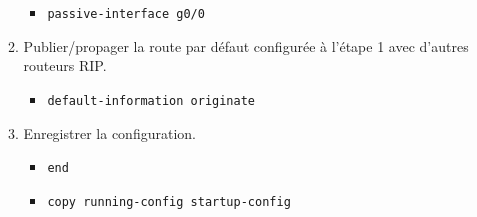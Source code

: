 \documentclass[a4paper]{article}
\begin{document}
\begin{itemize}
\begin{enumerate}
    \begin{example}
        \begin{itemize}
            \item \texttt{passive-interface g0/0}
        \end{itemize}
    \end{example}
    \item Publier/propager la route par défaut configurée à l'étape 1 avec d'autres routeurs RIP.
    \begin{example}
        \begin{itemize}
            \item \texttt{default-information originate}
        \end{itemize}
    \end{example}
    \item Enregistrer la configuration.
    \begin{example}
        \begin{itemize}
            \item \texttt{end}
            \item \texttt{copy running-config startup-config}
        \end{itemize}
    \end{example}
\end{enumerate}






\end{itemize}
\end{document}
